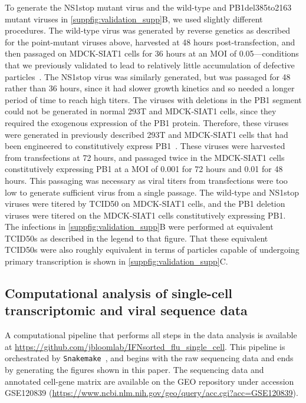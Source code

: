 \documentclass[10pt,letterpaper]{article}
\newcommand{\SUPPFIG}[1]{\autoref{suppfig:#1}}
\begin{document}
To generate the NS1stop mutant virus and the wild-type and PB1del385to2163 mutant viruses in \SUPPFIG{validation_supp}B, we used slightly different procedures.
The wild-type virus was generated by reverse genetics as described for the point-mutant viruses above, harvested at 48 hours post-transfection, and then passaged on MDCK-SIAT1 cells for 36 hours at an MOI of 0.05---conditions that we previously validated to lead to relatively little accumulation of defective particles~\citep{russell2018extreme}.
The NS1stop virus was similarly generated, but was passaged for 48 rather than 36 hours, since it had slower growth kinetics and so needed a longer period of time to reach high titers.
The viruses with deletions in the PB1 segment could not be generated in normal 293T and MDCK-SIAT1 cells, since they required the exogenous expression of the PB1 protein.
Therefore, these viruses were generated in previously described 293T and MDCK-SIAT1 cells that had been engineered to constitutively express PB1~\citep{bloom2010permissive}.
These viruses were harvested from transfections at 72 hours, and passaged twice in the MDCK-SIAT1 cells constitutively expressing PB1 at a MOI of 0.001 for 72 hours and 0.01 for 48 hours. 
This passaging was necessary as viral titers from transfections were too low to generate sufficient virus from a single passage.
The wild-type and NS1stop viruses were titered by TCID50 on MDCK-SIAT1 cells, and the PB1 deletion viruses were titered on the MDCK-SIAT1 cells constitutively expressing PB1.
The infections in \SUPPFIG{validation_supp}B were performed at equivalent TCID50s as described in the legend to that figure.
That these equivalent TCID50s were also roughly equivalent in terms of particles capable of undergoing primary transcription is shown in \SUPPFIG{validation_supp}C.

\subsection*{Computational analysis of single-cell transcriptomic and viral sequence data}
A computational pipeline that performs all steps in the data analysis is available at \url{https://github.com/jbloomlab/IFNsorted_flu_single_cell}. 
This pipeline is orchestrated by \texttt{Snakemake}~\citep{koster2012snakemake}, and begins with the raw sequencing data and ends by generating the figures shown in this paper.
The sequencing data and annotated cell-gene matrix are available on the GEO repository under accession GSE120839 (\url{https://www.ncbi.nlm.nih.gov/geo/query/acc.cgi?acc=GSE120839}).
\end{document}
